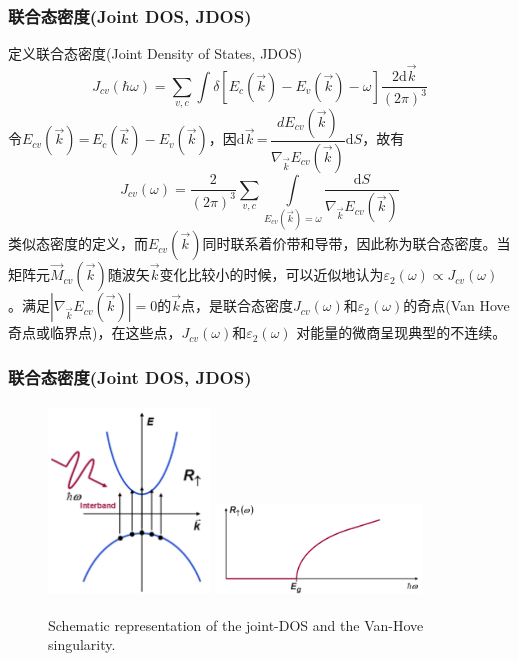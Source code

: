 {\frame
{
	\frametitle{联合态密度\textrm{(Joint DOS, JDOS)}}
定义联合态密度(\textrm{Joint Density of States, JDOS})
\begin{displaymath}
  J_{cv}(\hbar\omega)=\sum_{v,c}\int\delta[E_c(\vec k)-E_v(\vec k)-\omega]\frac{2\textrm{d}\vec k}{(2\pi)^3}
  \label{eq:optic-33}
\end{displaymath}
令$E_{cv}(\vec k)$\,=\,$E_c(\vec k)-E_v(\vec k)$，因$\textrm{d}\vec k$\,=\,$\dfrac{dE_{cv}(\vec k)}{\nabla_{\vec k}E_{cv}(\vec k)}\textrm{d}S$，故有
\begin{displaymath}
  J_{cv}(\omega)=\frac2{(2\pi)^3}\sum_{v,c}\int\limits_{E_{cv}(\vec k)=\omega}\frac{\textrm{d}S}{\nabla_{\vec k}E_{cv}(\vec k)}
  \label{eq:optic-34}
\end{displaymath}
类似态密度的定义，而$E_{cv}(\vec k)$同时联系着价带和导带，因此称为联合态密度。当矩阵元$\vec M_{cv}(\vec k)$随波矢$\vec k$变化比较小的时候，可以近似地认为$\varepsilon_2(\omega)\!\propto\!J_{cv}(\omega)$。满足$|\nabla_{\vec k}E_{cv}(\vec k)|\!=\!0$的$\vec k$点，是联合态密度$J_{cv}(\omega)$和$\varepsilon_2(\omega)$的奇点(\textrm{Van Hove}奇点或临界点)，在这些点，$J_{cv}(\omega)$和$\varepsilon_2(\omega)$%
对能量的微商呈现典型的不连续。%
}

\frame
{
	\frametitle{联合态密度\textrm{(Joint DOS, JDOS)}}
\begin{figure}[h!]
\centering
\vspace*{-0.05in}
\includegraphics[height=2.0in,width=1.7in,viewport=0 0 630 760,clip]{Figures/Inter_band-transition_R.png}
\includegraphics[height=1.0in,width=2.15in,viewport=0 0 1320 580,clip]{Figures/Inter_band-transition_JDOS.png}
\caption{\fontsize{5.2pt}{4.0pt}\selectfont\textrm{Schematic representation of the joint-DOS and the Van-Hove singularity.}}%
\label{Optic-JDOS}
\end{figure} 
}

}
